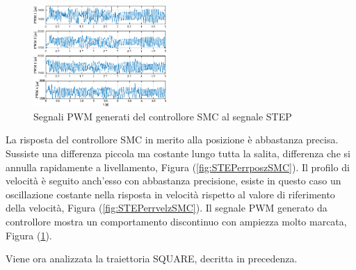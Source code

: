 \begin{figure}
	\centering
	\includegraphics[width=0.45\textwidth]{Simulazioni/Figure/SMC/STEP/PWM}
	\caption{Segnali PWM generati del controllore SMC al segnale STEP}
	\label{fig:STEPPWMSMC}
\end{figure}

La risposta del controllore SMC in merito alla posizione è abbastanza precisa. Sussiste una differenza piccola ma costante lungo tutta la salita, differenza che si annulla rapidamente a livellamento, Figura (\ref{fig:STEPerrposzSMC}). Il profilo di velocità è seguito anch'esso con abbastanza precisione, esiste in questo caso un oscillazione costante nella risposta in velocità rispetto al valore di riferimento della velocità, Figura (\ref{fig:STEPerrvelzSMC}). Il segnale PWM generato da controllore mostra un comportamento discontinuo con ampiezza molto marcata, Figura (\ref{fig:STEPPWMSMC}). 

Viene ora analizzata la traiettoria SQUARE, decritta in precedenza.

